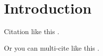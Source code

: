 %
%
\chapter{Introduction}
\label{chap:intro}
\setlength{\parskip}{1em}
%
Citation like this \cite{feynman1965feynman}. \par
%
\noindent Or you can multi-cite like this \cite{feynman1965feynman,dirac1929quantum}. \par
%
\noindent\lipsum[1]
%
%

